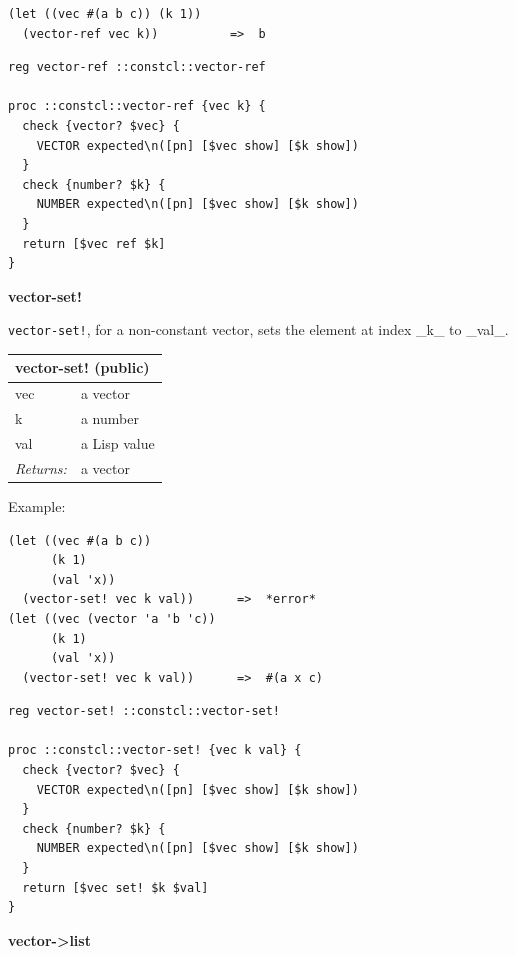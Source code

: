\documentclass[twoside,9pt]{report}
\begin{document}
\noindent\makebox[\linewidth]{\rule{\linewidth}{0.4pt}}
\begin{lstlisting}
(let ((vec #(a b c)) (k 1))
  (vector-ref vec k))          =>  b
\end{lstlisting}
\noindent\makebox[\linewidth]{\rule{\linewidth}{0.4pt}}
\noindent\makebox[\linewidth]{\rule{\linewidth}{0.4pt}}
\begin{lstlisting}
reg vector-ref ::constcl::vector-ref
 
proc ::constcl::vector-ref {vec k} {
  check {vector? $vec} {
    VECTOR expected\n([pn] [$vec show] [$k show])
  }
  check {number? $k} {
    NUMBER expected\n([pn] [$vec show] [$k show])
  }
  return [$vec ref $k]
}
\end{lstlisting}
\noindent\makebox[\linewidth]{\rule{\linewidth}{0.4pt}}

\textbf{vector-set!}


\texttt{vector-set!}, for a non-constant vector, sets the element at index \_k\_ to \_val\_.

\begin{tabular}{ |l l| }
\hline
\multicolumn{2}{|l|}{vector-set! (public)} \\
\hline
vec & a vector \\
k & a number \\
val & a Lisp value \\
\textit{Returns:} & a vector \\
\hline
\end{tabular}


Example:

\noindent\makebox[\linewidth]{\rule{\linewidth}{0.4pt}}
\begin{lstlisting}
(let ((vec #(a b c))
      (k 1)
      (val 'x))
  (vector-set! vec k val))      =>  *error*
(let ((vec (vector 'a 'b 'c))
      (k 1)
      (val 'x))
  (vector-set! vec k val))      =>  #(a x c)
\end{lstlisting}
\noindent\makebox[\linewidth]{\rule{\linewidth}{0.4pt}}
\noindent\makebox[\linewidth]{\rule{\linewidth}{0.4pt}}
\begin{lstlisting}
reg vector-set! ::constcl::vector-set!
 
proc ::constcl::vector-set! {vec k val} {
  check {vector? $vec} {
    VECTOR expected\n([pn] [$vec show] [$k show])
  }
  check {number? $k} {
    NUMBER expected\n([pn] [$vec show] [$k show])
  }
  return [$vec set! $k $val]
}
\end{lstlisting}
\noindent\makebox[\linewidth]{\rule{\linewidth}{0.4pt}}

\textbf{vector->list}
\end{document}
